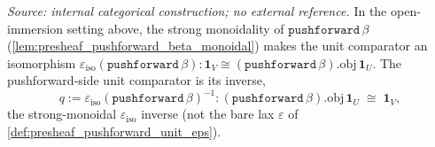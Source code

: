 \begin{definition}

  \label{def:presheaf_pushforward_unit_iso}
  \textit{Source: internal categorical construction; no external reference.}
  In the open-immersion setting above, the strong monoidality of \(\mathtt{pushforward}\,\beta\)
  (\cref{lem:presheaf_pushforward_beta_monoidal}) makes the unit comparator an isomorphism
  \(\varepsilon_{\mathrm{iso}}(\mathtt{pushforward}\,\beta) :
    \mathbf 1_V \cong (\mathtt{pushforward}\,\beta).\mathrm{obj}\,\mathbf 1_U\). The pushforward-side
  unit comparator is its inverse,
  \[
    q := \varepsilon_{\mathrm{iso}}(\mathtt{pushforward}\,\beta)^{-1} :
      (\mathtt{pushforward}\,\beta).\mathrm{obj}\,\mathbf 1_U \;\cong\; \mathbf 1_V ,
  \]
  the strong-monoidal \(\varepsilon_{\mathrm{iso}}\) inverse (not the bare lax \(\varepsilon\) of
  \cref{def:presheaf_pushforward_unit_eps}).
\end{definition}

